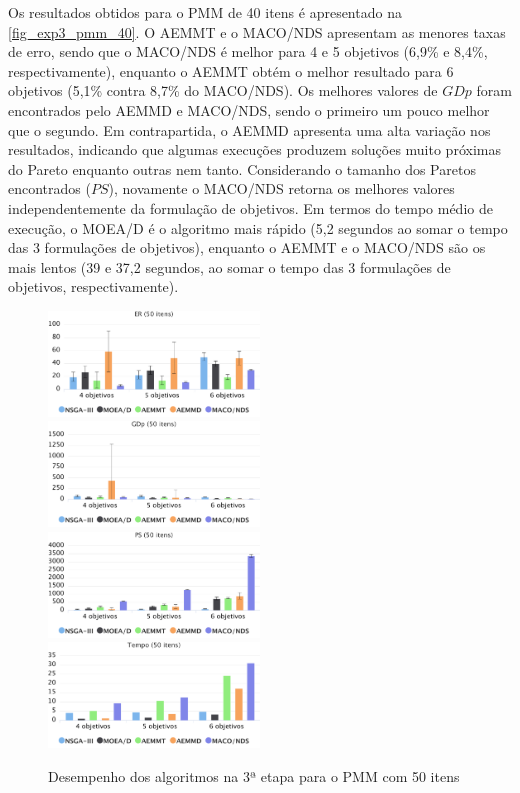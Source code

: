 Os resultados obtidos para o PMM de 40 itens é apresentado na \autoref{fig_exp3_pmm_40}. O AEMMT e o MACO/NDS apresentam as menores taxas de erro, sendo que o MACO/NDS é melhor para 4 e 5 objetivos (6,9\% e 8,4\%, respectivamente), enquanto o AEMMT obtém o melhor resultado para 6 objetivos (5,1\% contra 8,7\% do MACO/NDS). Os melhores valores de $GDp$ foram encontrados pelo AEMMD e MACO/NDS, sendo o primeiro um pouco melhor que o segundo. Em contrapartida, o AEMMD apresenta uma alta variação nos resultados, indicando que algumas execuções produzem soluções muito próximas do Pareto enquanto outras nem tanto. Considerando o tamanho dos Paretos encontrados ($PS$), novamente o MACO/NDS retorna os melhores valores independentemente da formulação de objetivos. Em termos do tempo médio de execução, o MOEA/D é o algoritmo mais rápido (5,2 segundos ao somar o tempo das 3 formulações de objetivos), enquanto o AEMMT e o MACO/NDS são os mais lentos (39 e 37,2 segundos, ao somar o tempo das 3 formulações de objetivos, respectivamente).

\begin{figure}[!htbp]
	\includegraphics[width=0.5\textwidth]{cap_experimentos/figs/etapa3/er-mkp-50}
	\includegraphics[width=0.5\textwidth]{cap_experimentos/figs/etapa3/gd-mkp-50}
	\includegraphics[width=0.5\textwidth]{cap_experimentos/figs/etapa3/ps-mkp-50}
	\includegraphics[width=0.5\textwidth]{cap_experimentos/figs/etapa3/time-mkp-50}
	\caption{\label{fig_exp3_pmm_50}Desempenho dos algoritmos na 3ª etapa para o PMM com 50 itens}
\end{figure}

